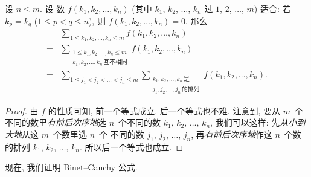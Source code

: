 \begin{theorem}
    设 \(n \leq m\).
    设%
    数 \(f(k_1, k_2, \dots, k_n)\)
    (其中
    \(k_1\), \(k_2\), \(\dots\), \(k_n\) 过
    \(1\), \(2\), \(\dots\), \(m\))
    适合:
    若 \(k_p = k_q\) (\(1 \leq p < q \leq n\)),
    则 \(f(k_1, k_2, \dots, k_n) = 0\).
    那么
    \begin{align*}
             &
        \sum_{1 \leq k_1, k_2, \dots, k_n \leq m}
        {f(k_1, k_2, \dots, k_n)}
        \\
        = {} &
        \sum_{\substack{
        1 \leq k_1, k_2, \dots, k_n \leq m \\
                k_1, k_2, \dots, k_n\,\text{互不相同}
            }}
        {f(k_1, k_2, \dots, k_n)}
        \\
        = {} &
        \sum_{1 \leq j_1 < j_2 < \dots < j_n \leq m}
        {\sum_{\substack{
        k_1, k_2, \dots, k_n\,\text{是}     \\
                    j_1, j_2, \dots, j_n\,\text{的排列}
                }}
            {f(k_1, k_2, \dots, k_n)}}.
    \end{align*}
\end{theorem}

\begin{proof}
    由 \(f\) 的性质可知, 前一个等式成立.
    后一个等式也不难.
    注意到,
    要从 \(m\)~个不同的数里\emph{有前后次序地}选
    \(n\)~个不同的数
    \(k_1\), \(k_2\), \(\dots\), \(k_n\),
    我们可以这样:
    先\emph{从小到大地}从这 \(m\)~个数里选 \(n\)~个%
    不同的数
    \(j_1\), \(j_2\), \(\dots\), \(j_n\),
    再\emph{有前后次序地}作这 \(n\)~个数的排列
    \(k_1\), \(k_2\), \(\dots\), \(k_n\).
    所以后一个等式也成立.
\end{proof}

现在, 我们证明 Binet--Cauchy 公式.

